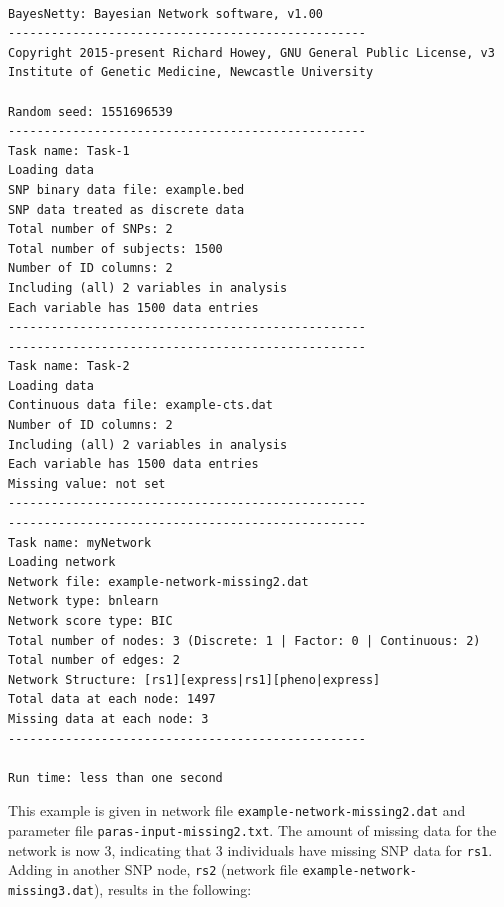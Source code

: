 \documentclass[a4paper,12pt]{article}
\newcommand{\code}[1]{{\footnotesize{{\tt #1}}}}
\begin{document}
\vspace{0.35cm} \begin{lstlisting}

BayesNetty: Bayesian Network software, v1.00
--------------------------------------------------
Copyright 2015-present Richard Howey, GNU General Public License, v3
Institute of Genetic Medicine, Newcastle University

Random seed: 1551696539
--------------------------------------------------
Task name: Task-1
Loading data
SNP binary data file: example.bed
SNP data treated as discrete data
Total number of SNPs: 2
Total number of subjects: 1500
Number of ID columns: 2
Including (all) 2 variables in analysis
Each variable has 1500 data entries
--------------------------------------------------
--------------------------------------------------
Task name: Task-2
Loading data
Continuous data file: example-cts.dat
Number of ID columns: 2
Including (all) 2 variables in analysis
Each variable has 1500 data entries
Missing value: not set
--------------------------------------------------
--------------------------------------------------
Task name: myNetwork
Loading network
Network file: example-network-missing2.dat
Network type: bnlearn
Network score type: BIC
Total number of nodes: 3 (Discrete: 1 | Factor: 0 | Continuous: 2)
Total number of edges: 2
Network Structure: [rs1][express|rs1][pheno|express]
Total data at each node: 1497
Missing data at each node: 3
--------------------------------------------------

Run time: less than one second

\end{lstlisting} \vspace{0.35cm}
This example is given in network file \code{example-network-missing2.dat} and parameter file \code{paras-input-missing2.txt}. The amount of missing data for the network is now 3, indicating that 3 individuals have missing SNP data for \code{rs1}. Adding in another SNP node, \code{rs2} (network file \code{example-network-missing3.dat}), results in the following: 
\end{document}
